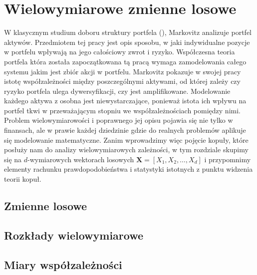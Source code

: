 \chapter{Wielowymiarowe zmienne losowe}
W klasycznym studium doboru struktury portfela (\cite{Markovitz_MPT}), Markovitz analizuje portfel aktywów. Przedmiotem tej pracy jest opis sposobu, w jaki indywidualne pozycje w portfelu wpływają na jego całościowy zwrot i ryzyko. Współczesna teoria portfela która została zapoczątkowana tą pracą wymaga zamodelowania całego systemu jakim jest zbiór akcji w portfelu. Markovitz pokazuje w swojej pracy istotę współzależności między poszczególnymi aktywami, od której zależy czy ryzyko portfela ulega dywersyfikacji, czy jest amplifikowane. Modelowanie każdego aktywa z osobna jest niewystarczające, ponieważ istota ich wpływu na portfel tkwi w przeważającym stopniu we współzależnościach pomiędzy nimi.\\
Problem wielowymiarowości i poprawnego jej opisu pojawia się nie tylko w finansach, ale w prawie każdej dziedzinie gdzie do realnych problemów aplikuje się modelowanie matematyczne. Zanim wprowadzimy więc pojęcie kopuły, które posłuży nam do analizy wielowymiarowych zależności, w tym rozdziale skupimy się na $d$-wymiarowych wektorach losowych $\mathbf{X} = [X_1, X_2, \dots, X_d]$ i przypomnimy elementy rachunku prawdopodobieństwa i statystyki istotnych z punktu widzenia teorii kopuł.\\

\section{Zmienne losowe}
\label{sec:rozklady_laczne}


\section{Rozkłady wielowymiarowe}
\label{sec:rozklady_wielowymiarowe}


\section{Miary współzależności}
\label{sec:miary_współzależności}



\mgrclosechapter